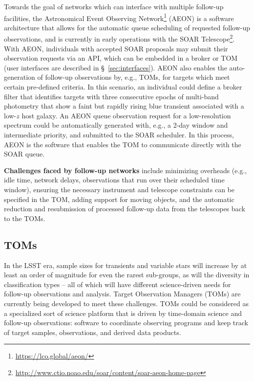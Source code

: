 Towards the goal of networks which can interface with multiple follow-up facilities, the Astronomical Event Observing Network\footnote{\url{https://lco.global/aeon/}} (AEON) is a software architecture that allows for the automatic queue scheduling of requested follow-up observations, and is currently in early operations with the SOAR Telescope\footnote{\url{http://www.ctio.noao.edu/soar/content/soar-aeon-home-page}}.
With AEON, individuals with accepted SOAR proposals may submit their observation requests via an API, which can be embedded in a broker or TOM (user interfaces are described in \S~\ref{sec:interfaces}).
AEON also enables the auto-generation of follow-up observations by, e.g., TOMs, for targets which meet certain pre-defined criteria.
In this scenario, an individual could define a broker filter that identifies targets with three consecutive epochs of multi-band photometry that show a faint but rapidly rising blue transient associated with a low-$z$ host galaxy.
An AEON queue observation request for a low-resolution spectrum could be automatically generated with, e.g., a 2-day window and intermediate priority, and submitted to the SOAR scheduler.
In this process, AEON is the software that enables the TOM to communicate directly with the SOAR queue.

{\bf Challenges faced by follow-up networks} include minimizing overheads (e.g., idle time, network delays, observations that run over their scheduled time window), ensuring the necessary instrument and telescope constraints can be specified in the TOM, adding support for moving objects, and the automatic reduction and resubmission of processed follow-up data from the telescopes back to the TOMs. 

\subsection{TOMs}\label{sec:followup_toms}

In the LSST era, sample sizes for transients and variable stars will increase by at least an order of magnitude for even the rarest sub-groups, as will the diversity in classification types -- all of which will have different science-driven needs for follow-up observations and analysis.
Target Observation Managers (TOMs) are currently being developed to meet these challenges.
TOMs could be considered as a specialized sort of science platform that is driven by time-domain science and follow-up observations: software to coordinate observing programs and keep track of target samples, observations, and derived data products. 

